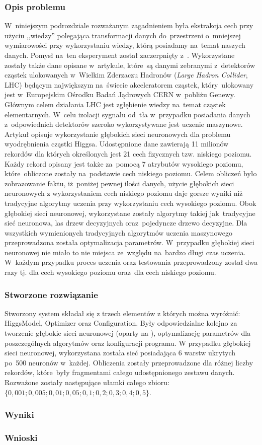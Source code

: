 \subsubsection{Opis problemu}
W~niniejszym podrozdziale rozważanym zagadnieniem była ekstrakcja cech przy użyciu ,,wiedzy'' polegająca transformacji danych do~przestrzeni o~mniejszej wymiarowości przy wykorzystaniu wiedzy, którą posiadamy na~temat naszych danych. Pomysł na~ten eksperyment został zaczerpnięty z~\cite{higgs1}. Wykorzystane zostały także dane opisane w~artykule, które~są danymi zebranymi z~detektorów cząstek ulokowanych w~Wielkim Zderzaczu Hadronów (\textit{Large Hadron Collider}, LHC) będącym największym na~świecie akceleratorem cząstek, który~ulokowany jest w~Europejskim Ośrodku Badań Jądrowych CERN w~pobliżu Genewy. Głównym celem działania LHC jest zgłębienie wiedzy na~temat cząstek elementarnych. W~celu izolacji sygnału od~tła w~przypadku posiadania danych z~odpowiednich detektorów szeroko wykorzystywane jest uczenie maszynowe. Artykuł opisuje wykorzystanie głębokich sieci neuronowych dla problemu wyodrębnienia cząstki Higgsa. Udostępnione dane zawierają 11 milionów rekordów dla których określonych jest 21 cech fizycznych tzw. niskiego poziomu. Każdy rekord opisany jest także za~pomocą 7 atrybutów wysokiego poziomu, które~obliczone zostały na~podstawie cech niskiego poziomu. Celem obliczeń było zobrazowanie faktu, iż~poniżej pewnej ilości danych, użycie głębokich sieci neuronowych z wykorzystaniem cech niskiego poziomu daje gorsze wyniki niż tradycyjne algorytmy uczenia przy wykorzystaniu cech wysokiego poziomu. Obok głębokiej sieci neuronowej, wykorzystane zostały algorytmy takiej jak~tradycyjne sieć neuronowa, las drzew decyzyjnych oraz~pojedyncze drzewo decyzyjne. Dla wszystkich wymienionych tradycyjnych algorytmów uczenia maszynowego przeprowadzona została optymalizacja parametrów. W~przypadku głębokiej sieci neuronowej nie miało to nie miejsca ze~względu na~bardzo długi czas uczenia. W~każdym przypadku proces uczenia oraz testowania przeprowadzony został dwa razy tj. dla cech wysokiego poziomu oraz~dla cech niskiego poziomu.

\subsubsection{Stworzone rozwiązanie}
Stworzony system składał się z trzech elementów z których można wyróżnić: HiggsModel, Optimizer oraz Configuration. Były odpowiedzialne kolejno za tworzenie głębokie sieci neuronowej (oparty na \cite{higgs2}), optymalizację parametrów dla poszczególnych algorytmów oraz konfiguracji programu. W przypadku głębokiej sieci neuronowej, wykorzystana została sieć posiadająca 6 warstw ukrytych po~500 neuronów w~każdej. Obliczenia zostały przeprowadzone dla różnej liczby rekordów, które~były fragmentami całego udostępnionego zestawu danych. Rozważone zostały następujące ułamki całego zbioru: $\{0,001; 0,005; 0,01; 0,05; 0,1; 0,2; 0,3; 0,4; 0,5\}$. 


\subsubsection{Wyniki}
\subsubsection{Wnioski}


